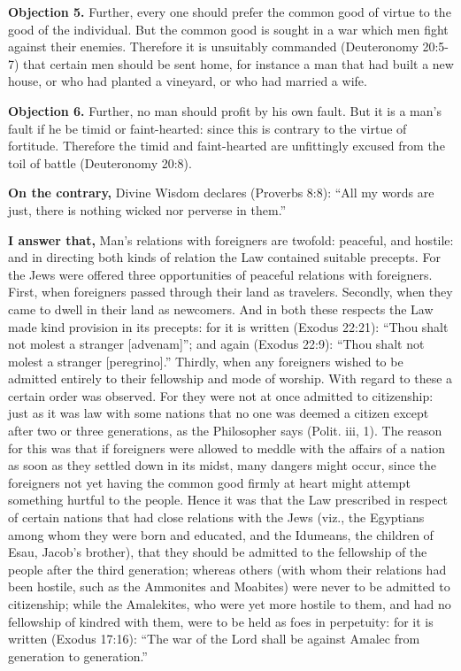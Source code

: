 \textbf{Objection 5.} Further, every one should prefer the common good of virtue to the good of the individual. But the common good is sought in a war which men fight against their enemies. Therefore it is unsuitably commanded (Deuteronomy 20:5-7) that certain men should be sent home, for instance a man that had built a new house, or who had planted a vineyard, or who had married a wife.

\textbf{Objection 6.} Further, no man should profit by his own fault. But it is a man's fault if he be timid or faint-hearted: since this is contrary to the virtue of fortitude. Therefore the timid and faint-hearted are unfittingly excused from the toil of battle (Deuteronomy 20:8).

\textbf{On the contrary,} Divine Wisdom declares (Proverbs 8:8): ``All my words are just, there is nothing wicked nor perverse in them.''

\textbf{I answer that,} Man's relations with foreigners are twofold: peaceful, and hostile: and in directing both kinds of relation the Law contained suitable precepts. For the Jews were offered three opportunities of peaceful relations with foreigners. First, when foreigners passed through their land as travelers. Secondly, when they came to dwell in their land as newcomers. And in both these respects the Law made kind provision in its precepts: for it is written (Exodus 22:21): ``Thou shalt not molest a stranger [advenam]''; and again (Exodus 22:9): ``Thou shalt not molest a stranger [peregrino].'' Thirdly, when any foreigners wished to be admitted entirely to their fellowship and mode of worship. With regard to these a certain order was observed. For they were not at once admitted to citizenship: just as it was law with some nations that no one was deemed a citizen except after two or three generations, as the Philosopher says (Polit. iii, 1). The reason for this was that if foreigners were allowed to meddle with the affairs of a nation as soon as they settled down in its midst, many dangers might occur, since the foreigners not yet having the common good firmly at heart might attempt something hurtful to the people. Hence it was that the Law prescribed in respect of certain nations that had close relations with the Jews (viz., the Egyptians among whom they were born and educated, and the Idumeans, the children of Esau, Jacob's brother), that they should be admitted to the fellowship of the people after the third generation; whereas others (with whom their relations had been hostile, such as the Ammonites and Moabites) were never to be admitted to citizenship; while the Amalekites, who were yet more hostile to them, and had no fellowship of kindred with them, were to be held as foes in perpetuity: for it is written (Exodus 17:16): ``The war of the Lord shall be against Amalec from generation to generation.''

